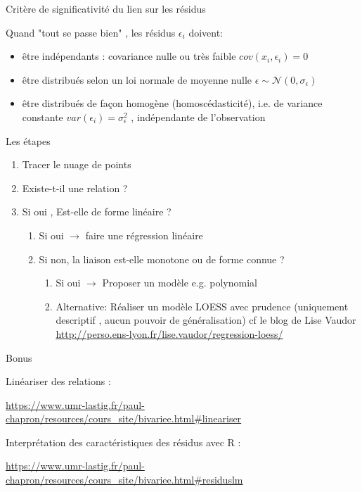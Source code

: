 \documentclass{beamer}
\begin{document}
\begin{frame}[fragile]{Critère de significativité du lien sur les résidus  }

Quand "tout se passe bien" , les \alert{résidus} $\epsilon_i$  doivent:


\begin{itemize}
\item être indépendants  : covariance nulle ou très faible $cov(x_i, \epsilon_i) = 0$
\item être distribués selon un loi normale de moyenne nulle $\epsilon \sim \mathscr{N}(0,\sigma_{\epsilon})$
\item être distribués de façon homogène (homoscédasticité), i.e. de variance constante $var(\epsilon_i)=\sigma_{\epsilon}^2$ , indépendante de l'observation
\end{itemize}

 
\end{frame}





\begin{frame}{Les étapes}

\begin{enumerate}
  \item Tracer le nuage de points
  \item Existe-t-il une relation ? 
  \item Si oui , Est-elle de forme linéaire ? 
  \begin{enumerate}
  \item Si oui  $\rightarrow$ faire une \alert{régression linéaire} 
   \item Si non, la liaison est-elle monotone ou de forme connue ?
   \begin{enumerate}
   \item Si oui $\rightarrow$  Proposer un \alert{modèle} e.g. polynomial
   \item Alternative: Réaliser un modèle \alert{LOESS} avec prudence (uniquement descriptif , aucun pouvoir de généralisation) cf le blog de Lise Vaudor \url{http://perso.ens-lyon.fr/lise.vaudor/regression-loess/}
\end{enumerate}
\end{enumerate}
\end{enumerate}


\end{frame}




\begin{frame}[fragile]{Bonus }


Linéariser des relations : 

\url{https://www.umr-lastig.fr/paul-chapron/resources/cours_site/bivariee.html#lineariser}


Interprétation des caractéristiques des résidus avec R  : 


\url{https://www.umr-lastig.fr/paul-chapron/resources/cours_site/bivariee.html#residuslm}
\end{frame}
\end{document}
